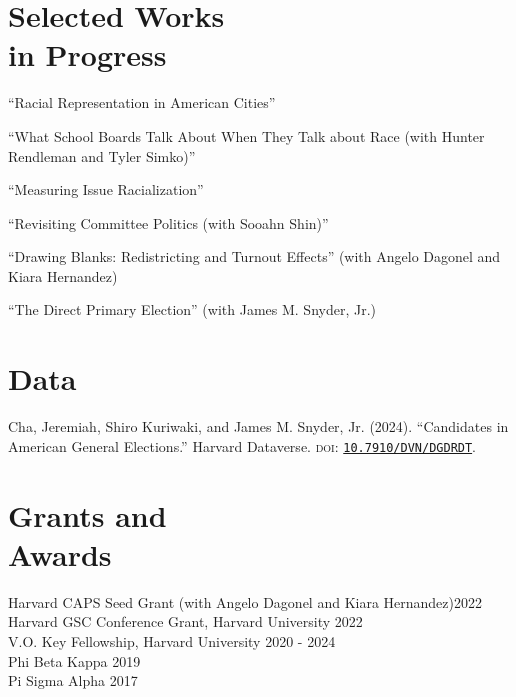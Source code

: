 \documentclass[margin, line]{res}
\begin{document}
\begin{resume}
\section{Selected Works \\in Progress}
\begin{etaremune}
	\item ``Racial Representation in American Cities''
	\item ``What School Boards Talk About When They Talk about Race (with Hunter Rendleman and Tyler Simko)'' 
	\item ``Measuring Issue Racialization''
	\item ``Revisiting Committee Politics (with Sooahn Shin)''
	\item ``Drawing Blanks: Redistricting and Turnout Effects'' (with Angelo Dagonel and Kiara Hernandez)
	\item ``The Direct Primary Election'' (with James M. Snyder, Jr.)
\end{etaremune}

\section{Data}
\begin{etaremune}
	\item Cha, Jeremiah, Shiro Kuriwaki, and James M. Snyder, Jr. (2024). ``Candidates in American General Elections.'' Harvard Dataverse. \textsc{doi}: \href{https://doi.org/10.7910/DVN/DGDRDT}{\texttt{10.7910/DVN/DGDRDT}}.
\end{etaremune}

\section{Grants and \\Awards}
Harvard CAPS Seed Grant (with Angelo Dagonel and Kiara Hernandez)\hfill 2022\\
Harvard GSC Conference Grant, Harvard University \hfill 2022\\
V.O. Key Fellowship, Harvard University \hfill 2020 - 2024\\
Phi Beta Kappa \hfill 2019\\
Pi Sigma Alpha \hfill 2017


\end{resume}
\end{document}
